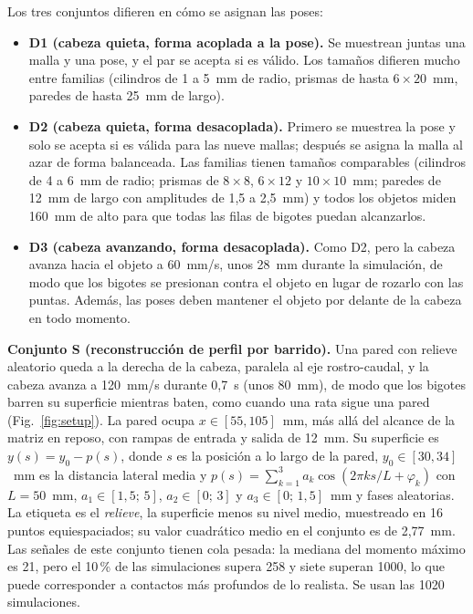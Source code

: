 \documentclass[conference]{IEEEtran}
\begin{document}
Los tres conjuntos difieren en cómo se asignan las poses:
\begin{itemize}
\item \textbf{D1 (cabeza quieta, forma acoplada a la pose).} Se muestrean juntas una malla y una pose, y el par se acepta si es válido. Los tamaños difieren mucho entre familias (cilindros de 1 a 5~mm de radio, prismas de hasta $6\times20$~mm, paredes de hasta 25~mm de largo).
\item \textbf{D2 (cabeza quieta, forma desacoplada).} Primero se muestrea la pose y solo se acepta si es válida para las nueve mallas; después se asigna la malla al azar de forma balanceada. Las familias tienen tamaños comparables (cilindros de 4 a 6~mm de radio; prismas de $8\times8$, $6\times12$ y $10\times10$~mm; paredes de 12~mm de largo con amplitudes de 1,5 a 2,5~mm) y todos los objetos miden 160~mm de alto para que todas las filas de bigotes puedan alcanzarlos.
\item \textbf{D3 (cabeza avanzando, forma desacoplada).} Como D2, pero la cabeza avanza hacia el objeto a 60~mm/s, unos 28~mm durante la simulación, de modo que los bigotes se presionan contra el objeto en lugar de rozarlo con las puntas. Además, las poses deben mantener el objeto por delante de la cabeza en todo momento.
\end{itemize}

\textbf{Conjunto S (reconstrucción de perfil por barrido).} Una pared con relieve aleatorio queda a la derecha de la cabeza, paralela al eje rostro-caudal, y la cabeza avanza a 120~mm/s durante 0,7~s (unos 80~mm), de modo que los bigotes barren su superficie mientras baten, como cuando una rata sigue una pared (Fig.~\ref{fig:setup}). La pared ocupa $x\in[55,105]$~mm, más allá del alcance de la matriz en reposo, con rampas de entrada y salida de 12~mm. Su superficie es $y(s)=y_0-p(s)$, donde $s$ es la posición a lo largo de la pared, $y_0\in[30,34]$~mm es la distancia lateral media y $p(s)=\sum_{k=1}^{3}a_k\cos(2\pi k s/L+\varphi_k)$ con $L=50$~mm, $a_1\in[1{,}5;\,5]$, $a_2\in[0;\,3]$ y $a_3\in[0;\,1{,}5]$~mm y fases aleatorias. La etiqueta es el \emph{relieve}, la superficie menos su nivel medio, muestreado en 16 puntos equiespaciados; su valor cuadrático medio en el conjunto es de 2,77~mm. Las señales de este conjunto tienen cola pesada: la mediana del momento máximo es 21, pero el 10\,\% de las simulaciones supera 258 y siete superan 1000, lo que puede corresponder a contactos más profundos de lo realista. Se usan las 1020 simulaciones.
\end{document}
